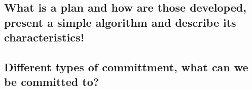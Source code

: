 \subsection{What is a plan and how are those developed, present a simple algorithm and describe its characteristics!}
\subsection{Different types of committment, what can we be committed to?}

